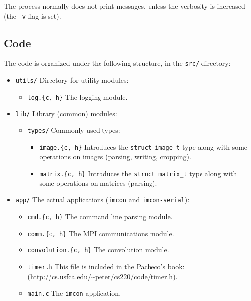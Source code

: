 \documentclass[11pt,a4paper,oneside]{article}
\begin{document}
The process normally does not print messages, unless the verbosity is increased
(the \texttt{-v} flag is set).

\subsection{Code}

The code is organized under the following structure, in the \texttt{src/}
directory:

\begin{itemize}
    \item \texttt{utils/} Directory for utility modules:
        \begin{itemize}
            \item \texttt{log.\{c, h\}} The logging module.
        \end{itemize}
    \item \texttt{lib/} Library (common) modules:
        \begin{itemize}
            \item \texttt{types/} Commonly used types:
            \begin{itemize}
                \item \texttt{image.\{c, h\}} Introduces the
                    \texttt{struct image\_t} type along with some operations on
                    images (parsing, writing, cropping).
                \item \texttt{matrix.\{c, h\}} Introduces the
                    \texttt{struct matrix\_t} type along with some operations on
                    matrices (parsing).
            \end{itemize}
        \end{itemize}
    \item \texttt{app/} The actual applications (\texttt{imcon} and
        \texttt{imcon-serial}):
        \begin{itemize}
            \item \texttt{cmd.\{c, h\}} The command line parsing module.
            \item \texttt{comm.\{c, h\}} The MPI communications module.
            \item \texttt{convolution.\{c, h\}} The convolution module.
            \item \texttt{timer.h} This file is included in the Pacheco's book:
                (\url{http://cs.usfca.edu/~peter/cs220/code/timer.h}).
            \item \texttt{main.c} The \texttt{imcon} application.

\end{itemize}
\end{itemize}
\end{document}
